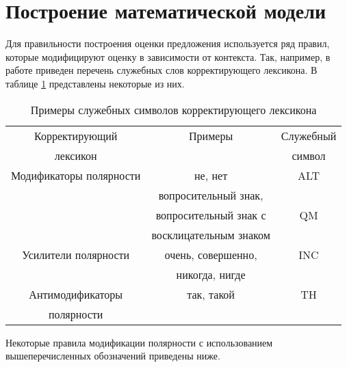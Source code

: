 \section{Построение математической модели}
Для правильности построения оценки предложения используется ряд правил, которые модифицируют оценку в зависимости от контекста. Так, например, в работе \cite{neg} приведен перечень служебных слов корректирующего лексикона. В таблице \ref{wrdneg} представлены некоторые из них. 
\begin{table}[H]
	\caption{Примеры служебных символов корректирующего лексикона}
	\centering
	\renewcommand{\arraystretch}{1.5}
	\begin{tabular}{ccc}
		\hline Корректирующий & Примеры & Служебный \\
		лексикон & ~ & символ \\ \hline
		Модификаторы полярности & не, нет & ALT \\ \hline
		& вопросительный знак, & \\
		& вопросительный знак с & QM \\ 
		& восклицательным знаком & \\ \hline
		Усилители полярности & очень, совершенно, & INC \\ 
		& никогда, нигде & \\ \hline
		Антимодификаторы & так, такой & TH \\
		полярности & & \\
	\end{tabular}
	\label{wrdneg}
\end{table}
Некоторые правила модификации полярности с использованием вышеперечисленных обозначений приведены ниже. 
